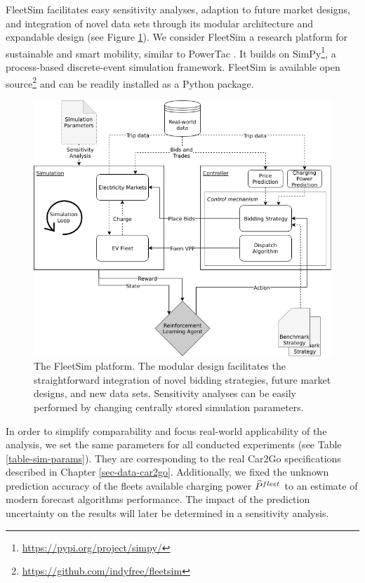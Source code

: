 \documentclass[a4paper, 12pt]{article}
\let\cite\shortcite
\begin{document}
FleetSim facilitates easy sensitivity analyses, adaption to future market
designs, and integration of novel data sets through its modular architecture and
expandable design (see Figure \ref{fig-fleetsim}). We consider FleetSim a research
platform for sustainable and smart mobility, similar to PowerTac
\cite{ketter16_multiagent_comp_gaming}. It builds on SimPy\footnote{\url{https://pypi.org/project/simpy/}}, a process-based
discrete-event simulation framework. FleetSim is available open source\footnote{\url{https://github.com/indyfree/fleetsim}} and
can be readily installed as a Python package.
\begin{figure}[hp]
\centering
\includegraphics[width=1\linewidth]{fig/simulation-platform.png}
\caption[The FleetSim Platform]{The FleetSim platform. The modular design facilitates the straightforward integration of novel bidding strategies, future market designs, and new data sets. Sensitivity analyses can be easily performed by changing centrally stored simulation parameters. \label{fig-fleetsim}}
\end{figure}

In order to simplify comparability and focus real-world applicability of the
analysis, we set the same parameters for all conducted experiments (see Table
\ref{table-sim-params}). They are corresponding to the real Car2Go specifications
described in Chapter \ref{sec-data-car2go}. Additionally, we fixed the unknown
prediction accuracy of the fleets available charging power \(\widehat{P}^{fleet}_{}\) to an
estimate of modern forecast algorithms performance. The impact of the prediction
uncertainty on the results will later be determined in a sensitivity analysis.
\end{document}
